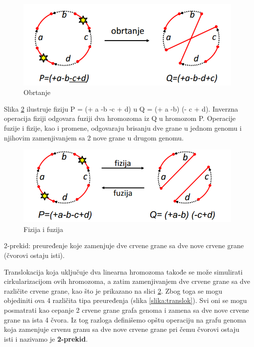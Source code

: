 \begin{figure}[h!]
\centering
\includegraphics[scale=0.6]{poglavlja/6/slike/obrtanje.PNG}
\caption{Obrtanje}
\label{slika:obrtanje}
\end{figure}

Slika \ref{slika:fuzFiz} ilustruje fiziju P = (+ a -b -c + d) u Q = (+ a -b) (- c + d).
Inverzna operacija fiziji odgovara fuziji dva hromozoma iz Q u hromozom P. Operacije fuzije i fizije, kao i promene, odgovaraju brisanju dve grane u jednom genomu i njihovim zamenjivanjem sa 2 nove grane u drugom genomu.\\

\begin{figure}[h!]
\centering
\includegraphics[scale=0.6]{poglavlja/6/slike/fizija_fusija.PNG}
\caption{Fizija i fuzija}
\label{slika:fuzFiz}
\end{figure}


\begin{definicija}
{2-prekid: preuređenje koje zamenjuje dve crvene grane sa dve nove crvene grane (čvorovi ostaju isti).}	
\end{definicija}

Translokacija koja uključuje dva linearna hromozoma takođe se može simulirati cirkularizacijom ovih hromozoma, a zatim zamenjivanjem dve crvene grane sa dve različite crvene grane, kao što je prikazano na slici \ref{slika:fuzFiz}. Zbog toga se mogu objediniti ova 4 različita tipa preuređenja (slika \ref{slika:translok}). Svi oni se mogu posmatrati kao cepanje 2 crvene grane grafa genoma i zamena sa dve nove crvene grane na ista 4 čvora. Iz tog razloga definišemo opštu operaciju na grafu genoma koja zamenjuje crvenu granu sa dve nove crvene grane pri čemu čvorovi ostaju isti i nazivamo je \textbf{2-prekid}.\\




